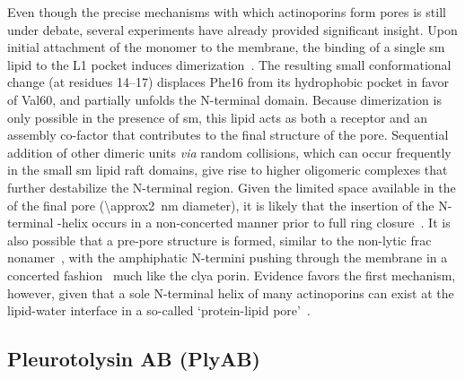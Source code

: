 Even though the precise mechanisms with which actinoporins form pores is still under debate, several
experiments have already provided significant insight. Upon initial attachment of the monomer to the membrane,
the binding of a single \gls{sm} lipid to the L1 pocket induces dimerization~\cite{Tanaka-2015}. The resulting
small conformational change (at residues 14--17) displaces Phe16 from its hydrophobic pocket in favor of
Val60, and partially unfolds the N-terminal domain. Because dimerization is only possible in the presence of
\gls{sm}, this lipid acts as both a receptor and an assembly co-factor that contributes to the final structure
of the pore. Sequential addition of other dimeric units \textit{via} random collisions, which can occur
frequently in the small \gls{sm} lipid raft domains, give rise to higher oligomeric complexes that further
destabilize the N-terminal region. Given the limited space available in the \lumen{} of the final pore
(\SI{\approx2}{\nm} diameter), it is likely that the insertion of the N-terminal \ta-helix occurs in a
non-concerted manner prior to full ring closure~\cite{Cosentino-2016}. It is also possible that a pre-pore
structure is formed, similar to the non-lytic \gls{frac} nonamer~\cite{Mechaly-2011}, with the amphiphatic
N-termini pushing through the membrane in a concerted fashion~\cite{Tanaka-2015,Rojko-2016} much like the
\gls{clya} porin. Evidence favors the first mechanism, however, given that a sole N-terminal helix of many
actinoporins can exist at the lipid-water interface in a so-called `protein-lipid pore'~\cite{Cosentino-2016}.


%
\subsection{Pleurotolysin AB (PlyAB)}
%
\label{sec:np:plyab}
%

